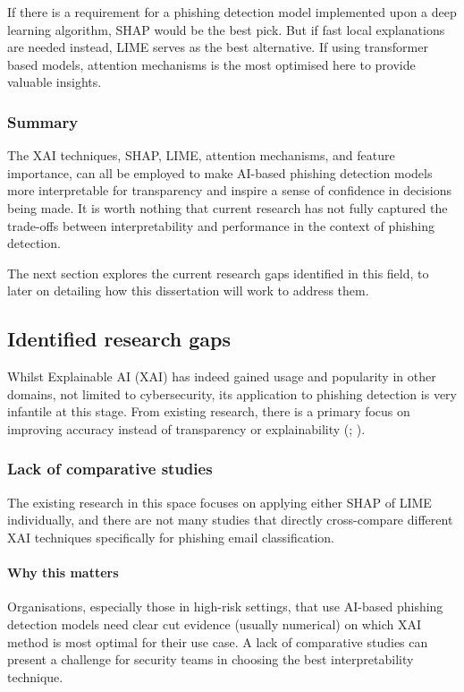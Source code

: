 \noindent If there is a requirement for a phishing detection model implemented upon a deep learning algorithm, SHAP would be the best pick. But if fast local explanations are needed instead, LIME serves as the best alternative. If using transformer based models, attention mechanisms is the most optimised here to provide valuable insights.

\subsubsection*{Summary}

\noindent The XAI techniques, SHAP, LIME, attention mechanisms, and feature importance, can all be employed to make AI-based phishing detection models more interpretable for transparency and inspire a sense of confidence in decisions being made. It is worth nothing that current research has not fully captured the trade-offs between interpretability and performance in the context of phishing detection.\newline

\noindent The next section explores the current research gaps identified in this field, to later on detailing how this dissertation will work to address them.

\newpage

\subsection*{Identified research gaps}
Whilst Explainable AI (XAI) has indeed gained usage and popularity in other domains, not limited to cybersecurity, its application to phishing detection is very infantile at this stage. From existing research, there is a primary focus on improving accuracy instead of transparency or explainability (\cite{lundberg2017unified}; \cite{ribeiro2016model}).

\subsubsection*{Lack of comparative studies}
The existing research in this space focuses on applying either SHAP of LIME individually, and there are not many studies that directly cross-compare different XAI techniques specifically for phishing email classification.

\paragraph{Why this matters}
Organisations, especially those in high-risk settings, that use AI-based phishing detection models need clear cut evidence (usually numerical) on which XAI method is most optimal for their use case. A lack of comparative studies can present a challenge for security teams in choosing the best interpretability technique.

